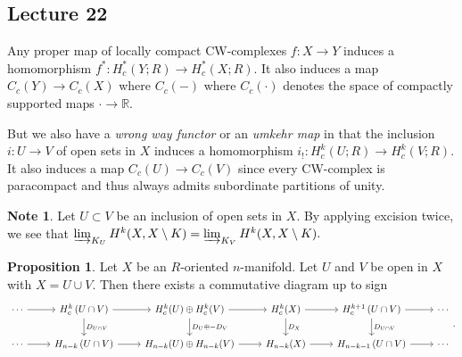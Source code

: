 \documentclass[10pt,letterpaper,cm]{nupset}
\theoremstyle{definition}
\newtheorem{note}[definition]{Note}
\theoremstyle{theorem}
\newtheorem{prop}[definition]{Proposition}
\theoremstyle{remark}
\newcommand{\R}{\mathbb{R}}
\newcommand{\1}{\mathbb{1}}
\newcommand{\0}{\vec 0}
\begin{document}
\subsection{Lecture 22}


Any  proper map of locally compact CW-complexes $f: X \to Y$ induces  a homomorphism $f^{\ast}: H_c^{\ast}(Y; R) \to H_c^{\ast}(X; R)$. It also induces a map $C_c(Y) \to C_c(X)$ where $C_c({-})$ where $C_c({\cdot})$ denotes the space of compactly supported  maps ${\cdot} \to \R$.

But we also have a \textit{wrong way functor} or an \textit{umkehr map} in that the inclusion $i: U \to V$ of open sets in $X$ induces a homomorphism $i_{!} : H_c^k(U; R) \to H_c^k(V; R)$. It also induces a map $C_c(U) \to C_c(V)$ since every CW-complex is paracompact and thus always admits subordinate partitions of unity.


\begin{note}
Let $U \subset V$ be an inclusion of open sets in $X$. By applying excision twice, we see that $\varinjlim_{K_U} H^k(X, X \setminus K) = \varinjlim_{K_V} H^k(X, X \setminus K).$
\end{note}

\begin{prop}\label{p3}
Let $X$ be an $R$-oriented $n$-manifold.  Let $U$ and $V$ be open in $X$ with $X = U \cup V$. Then there exists a commutative diagram up to sign
\[
\begin{tikzcd}
\cdots \arrow[r] & H^k_c\left(U \cap V\right) \arrow[r] \arrow[d, "D_{U \cap V}"] & H_c^k(U)\oplus H_c^k(V) \arrow[r] \arrow[d, "D_U \oplus {-}D_V"] & H_c^k(X) \arrow[r] \arrow[d, "D_X"] & H^{k+1}_c\left(U \cap V\right) \arrow[d, "D_{U \cap V}"] \arrow[r] & \cdots \\
\cdots \arrow[r] & H_{n-k}\left(U \cap V\right) \arrow[r]                         & H_{n-k}(U) \oplus H_{n-k}(V) \arrow[r]                           & H_{n-k}(X) \arrow[r]                & H_{n-k-1}\left(U \cap V\right) \arrow[r]                         & \cdots
\end{tikzcd}
.\]
\end{prop}
\end{document}
